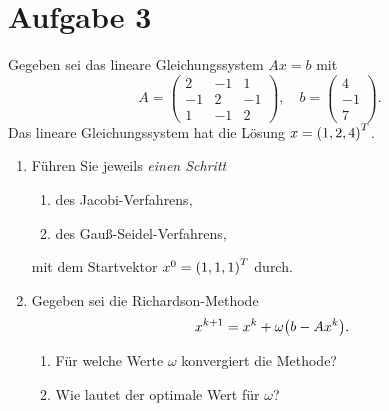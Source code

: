 \documentclass{exercise}
\begin{document}
    \section*{Aufgabe 3}
    
    \begin{problem}
        Gegeben sei das lineare Gleichungssystem \(Ax = b\) mit
        \[
            A = \begin{pmatrix}
                2 & -1 & 1\\
                -1 & 2 & -1\\
                1 & -1 & 2
            \end{pmatrix}, \quad b = \begin{pmatrix}
                4\\
                -1\\
                7
            \end{pmatrix}.
        \]
        Das lineare Gleichungssystem hat die Lösung \(x = \parentheses*{1, 2, 4}^T\).
        \begin{enumerate}
            \item Führen Sie jeweils \emph{einen Schritt}
            \begin{enumerate}
                \item des Jacobi-Verfahrens,
                \item des Gauß-Seidel-Verfahrens,
            \end{enumerate}
            mit dem Startvektor \(x^0 = \parentheses*{1, 1, 1}^T\) durch.
            \item Gegeben sei die Richardson-Methode
            \[
                x^{k + 1} = x^k + \omega\parentheses*{b - Ax^k}.
            \]
            \begin{enumerate}
                \item Für welche Werte \(\omega\) konvergiert die Methode?
                \item Wie lautet der optimale Wert für \(\omega\)?
            \end{enumerate}
        \end{enumerate}
    \end{problem}
    
\end{document}

